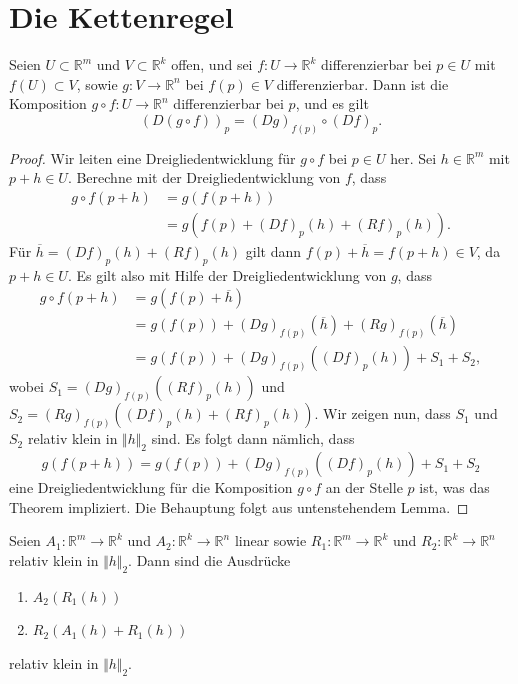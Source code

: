 \documentclass[../main.tex]{subfiles}
\begin{document}
\section{Die Kettenregel}
\begin{theorem*}[Kettenregel]
  Seien $U \subset \mathbb{R}^m$ und $V \subset \mathbb{R}^k$ 
  offen, und sei $f \colon U \to \mathbb{R}^k$ differenzierbar
  bei $p \in U$ mit $f(U) \subset V$,
  sowie $g \colon V \to \mathbb{R}^n$ bei $f(p) \in V$ 
  differenzierbar.
  Dann ist die Komposition $g \circ f \colon U \to \mathbb{R}^n$ 
  differenzierbar bei $p$, und es gilt
  \[
    {(D(g \circ f))}_p = {(Dg)}_{f(p)} \circ {(Df)}_p.
  \]
\end{theorem*}

\begin{proof}
  Wir leiten eine Dreigliedentwicklung
  für $g \circ f$ bei $p \in U$ her.
  Sei $h \in \mathbb{R}^m$ mit $p + h \in U$.
  Berechne mit der Dreigliedentwicklung von $f$, dass
  \begin{align*}
    g \circ f ( p + h)
    & = g ( f ( p + h ))\\
    &= g(f(p) + {(Df)}_p(h) + {(Rf)}_p(h)).
  \end{align*}
  Für $\overline h = {(Df)}_p(h) + {(Rf)}_p(h)$ gilt dann
  $f(p) + \overline h = f(p+h) \in V$, da $p + h \in U$.
  Es gilt also mit Hilfe der Dreigliedentwicklung von $g$, dass
  \begin{align*}
    g \circ f(p+h)
    & = g(f(p) + \overline h) \\
    &= g(f(p)) + {(Dg)}_{f(p)}(\overline h) + {(Rg)}_{f(p)}(\overline h) \\
    &= g(f(p)) + {(Dg)}_{f(p)}({(Df)}_p(h)) + S_1 + S_2,
  \end{align*}
  wobei $S_1 = {(Dg)}_{f(p)}({(Rf)}_p(h))$ und
  $S_2 = {(Rg)}_{f(p)}({(Df)}_p(h) + {(Rf)}_p(h))$.
  Wir zeigen nun, dass $S_1$ und $S_2$ relativ klein
  in $\Vert h \Vert_2$ sind.
  Es folgt dann nämlich, dass
  \[
    g(f(p + h)) = g(f(p)) + {(Dg)}_{f(p)}({(Df)}_p(h)) + S_1 + S_2
  \]
  eine Dreigliedentwicklung für die Komposition
  $g \circ f$ an der Stelle $p$ ist,
  was das Theorem impliziert.
  Die Behauptung folgt aus untenstehendem Lemma.
\end{proof}

\begin{lemma*}
  Seien $A_1 \colon \mathbb{R}^m \to \mathbb{R}^k$ 
  und $A_2 \colon \mathbb{R}^k \to \mathbb{R}^n$ linear
  sowie $R_1 \colon \mathbb{R}^m \to \mathbb{R}^k$ 
  und $R_2 \colon \mathbb{R}^k \to \mathbb{R}^n$ 
  relativ klein in $\Vert h \Vert_2$.
  Dann sind die Ausdrücke
  \begin{enumerate}[\normalfont(i)]
    \item $A_2(R_1(h))$ 
    \item $R_2(A_1(h) + R_1(h))$
  \end{enumerate}
  relativ klein in $\Vert h \Vert_2$.
\end{lemma*}
\end{document}
